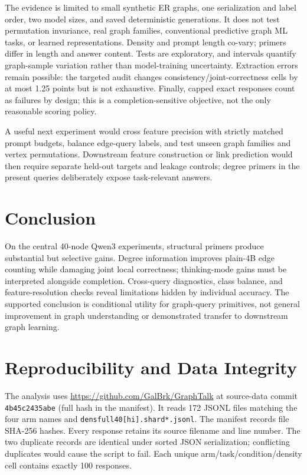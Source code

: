 \documentclass[11pt]{article}
\begin{document}
The evidence is limited to small synthetic ER graphs, one serialization and label order, two model sizes, and saved deterministic generations. It does not test permutation invariance, real graph families, conventional predictive graph ML tasks, or learned representations. Density and prompt length co-vary; primers differ in length and answer content. Tests are exploratory, and intervals quantify graph-sample variation rather than model-training uncertainty. Extraction errors remain possible: the targeted audit changes consistency/joint-correctness cells by at most 1.25 points but is not exhaustive. Finally, capped exact responses count as failures by design; this is a completion-sensitive objective, not the only reasonable scoring policy.

A useful next experiment would cross feature precision with strictly matched prompt budgets, balance edge-query labels, and test unseen graph families and vertex permutations. Downstream feature construction or link prediction would then require separate held-out targets and leakage controls; degree primers in the present queries deliberately expose task-relevant answers.

\section{Conclusion}
On the central 40-node Qwen3 experiments, structural primers produce substantial but selective gains. Degree information improves plain-4B edge counting while damaging joint local correctness; thinking-mode gains must be interpreted alongside completion. Cross-query diagnostics, class balance, and feature-resolution checks reveal limitations hidden by individual accuracy. The supported conclusion is conditional utility for graph-query primitives, not general improvement in graph understanding or demonstrated transfer to downstream graph learning.
\label{mainend}

\clearpage
\appendix
\section{Reproducibility and Data Integrity}
The analysis uses \url{https://github.com/GalBrk/GraphTalk} at source-data commit \texttt{4b45c2435abe} (full hash in the manifest). It reads 172 JSONL files matching the four arm names and \texttt{densfull40[hi].shard*.jsonl}. The manifest records file SHA-256 hashes. Every response retains its source filename and line number. The two duplicate records are identical under sorted JSON serialization; conflicting duplicates would cause the script to fail. Each unique arm/task/condition/density cell contains exactly 100 responses.
\end{document}
